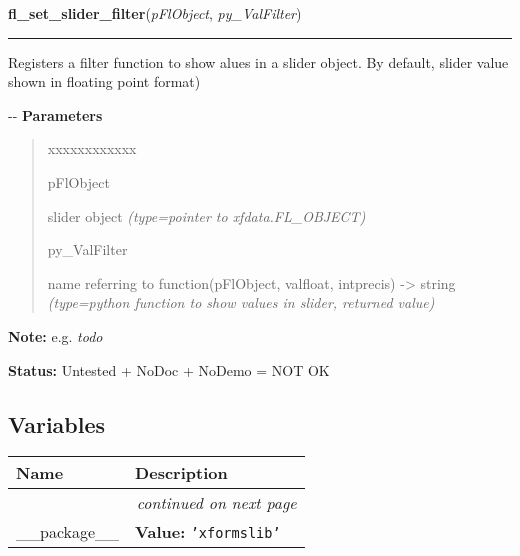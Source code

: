 \hspace{.8\funcindent}\begin{boxedminipage}{\funcwidth}

    \raggedright \textbf{fl\_set\_slider\_filter}(\textit{pFlObject}, \textit{py\_ValFilter})

    \vspace{-1.5ex}

    \rule{\textwidth}{0.5\fboxrule}
\setlength{\parskip}{2ex}

Registers a filter function to show alues in a slider object. By
default, slider value shown in floating point format)

-{}-
\setlength{\parskip}{1ex}
      \textbf{Parameters}
      \vspace{-1ex}

      \begin{quote}
        \begin{Ventry}{xxxxxxxxxxxx}

          \item[pFlObject]


slider object
            {\it (type=pointer to xfdata.FL\_OBJECT)}

          \item[py\_ValFilter]


name referring to function(pFlObject, valfloat, intprecis) -> string
            {\it (type=python function to show values in slider, returned value)}

        \end{Ventry}

      \end{quote}

\textbf{Note:} 
e.g. \emph{todo}


\textbf{Status:} 
Untested + NoDoc + NoDemo = NOT OK


    \end{boxedminipage}



  \subsection{Variables}

    \vspace{-1cm}
\hspace{\varindent}\begin{longtable}{|p{\varnamewidth}|p{\vardescrwidth}|l}
\cline{1-2}
\cline{1-2} \centering \textbf{Name} & \centering \textbf{Description}& \\
\cline{1-2}
\endhead\cline{1-2}\multicolumn{3}{r}{\small\textit{continued on next page}}\\\endfoot\cline{1-2}
\endlastfoot\raggedright \_\-\_\-p\-a\-c\-k\-a\-g\-e\-\_\-\_\- & \raggedright \textbf{Value:} 
{\tt \texttt{'}\texttt{xformslib}\texttt{'}}&\\
\cline{1-2}
\end{longtable}

